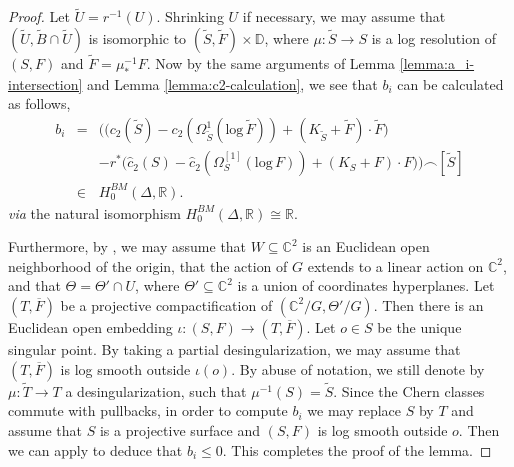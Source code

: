 \documentclass[12pt]{amsart}
\newcommand{\<}{\leq}
\theoremstyle{remark}
\theoremstyle{definition}
\theoremstyle{definition}
\numberwithin{equation}{section}
\theoremstyle{definition}
\theoremstyle{definition}
\begin{document}
\begin{proof}
 
Let $\widetilde{U}=r^{-1}(U)$. 
Shrinking $U$ if necessary, we may assume that 
$(\widetilde{U}, \widetilde{B}\cap \widetilde{U})$ is isomorphic to $(\widetilde{S}, \widetilde{F})\times \mathbb{D}$, where $\mu \colon \widetilde{S} \to S$ is a log resolution of $(S,F)$ and $\widetilde{F} = \mu^{-1}_*F$. 
Now by the same arguments of  Lemma \ref{lemma:a_i-intersection} and Lemma \ref{lemma:c2-calculation}, 
we see that $b_i$ can be calculated as follows,
\begin{eqnarray*}
 b_i &=& \Big( \Big({c}_2(\widetilde{S}) -  {c_2}(\Omega_{\widetilde{S}}^{1}(\mathrm{log}\, \widetilde{F})) + (K_{\widetilde{S}}+\widetilde{F}) \cdot \widetilde{F}\Big) \\
 & & - r^* \Big( \hat{c}_2(S) - \hat{c}_2(\Omega_S^{[1]}(\mathrm{log}\, F)) + (K_S+F) \cdot F \Big)  \Big) \smallfrown [\widetilde{S}] \\
 &\in & H^{BM}_0(\Delta, \mathbb{R}).
\end{eqnarray*}
 \textit{via} the natural isomorphism $H^{BM}_0(\Delta, \mathbb{R}) \cong \mathbb{R}$. 

 Furthermore, by \cite[Lemma 9.9]{Kaw88},   we may assume that 
 $W\subseteq \mathbb{C}^2$ is an Euclidean open neighborhood of the origin, that the action of $G$ extends to a linear action on $\mathbb{C}^2$, and that $\Theta=\Theta'\cap U$, where $\Theta'\subseteq \mathbb{C}^2$ is a union of coordinates hyperplanes.  
Let $(T, \overline{F})$ be a projective compactification of $(\mathbb{C}^2/G, \Theta'/G).$ 
Then there is an Euclidean open embedding $\iota\colon (S,F) \to (T, \overline{F})$. 
Let $o\in S$ be the unique singular point. 
By taking a  partial desingularization, we may assume that $(T,\overline{F})$ is log smooth outside $\iota(o)$.  
By abuse of notation, we still denote by $\mu\colon \widetilde{T} \to T$ a desingularization, such that $\mu^{-1}(S) = \widetilde{S}$. 
Since the Chern classes commute with pullbacks,   in order to compute $b_i$ we may replace $S$ by $T$ and assume that $S$ is a projective surface and $(S,F)$ is log smooth outside $o$.   
Then  we can apply  \cite[Equation (10.8.8)]{Kol92} to deduce that $b_i \< 0$. 
 This completes the proof of the lemma. 
\end{proof}
 
\end{document}
